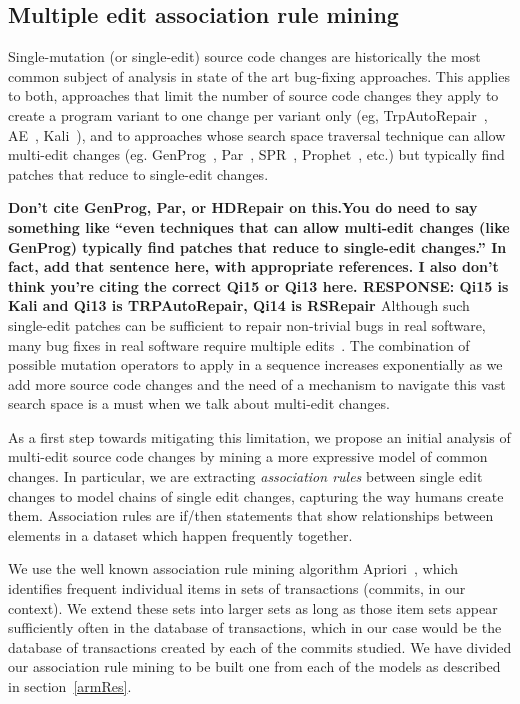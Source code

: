 \documentclass[conference]{IEEEtran}
\newcommand{\todo}[1]
  {{\scriptsize \textbf{\color{red} {#1}}}}
\begin{document}
\subsection{Multiple edit association rule mining} 
\label{multEdit}

Single-mutation (or single-edit) source code changes are historically the most 
common subject of analysis in 
state of the art bug-fixing
approaches. This applies to both, approaches that limit the number of source 
code changes they apply to create a program variant to one change per variant 
only (eg, TrpAutoRepair~\cite{Qi13}, AE~\cite{Weimer13}, Kali~\cite{Qi15}), and 
to approaches whose search space traversal technique can allow multi-edit 
changes (eg. GenProg~\cite{legoues12}, Par~\cite{kim2013}, SPR~\cite{fan15},
Prophet~\cite{Long2016}, etc.) but typically find patches that reduce to single-edit changes.

\todo{Don't cite GenProg, Par, or HDRepair on this.You do need to say something 
like ``even  techniques that can allow multi-edit changes (like GenProg) typically find
  patches that reduce to single-edit changes.''  In fact, add that sentence
  here, with appropriate references.   I also don't think you're
  citing the correct Qi15 or Qi13 here. RESPONSE: Qi15 is Kali and Qi13 is 
TRPAutoRepair, Qi14 is RSRepair }
Although such single-edit patches can be
sufficient to repair non-trivial bugs in real software, many bug fixes in real
software require multiple edits~\cite{Weimer13}. The combination of possible mutation operators to apply in a sequence increases exponentially as we add more source code changes and the need of a mechanism to navigate this vast search space is a must when we talk about multi-edit changes.

As a first step towards mitigating this limitation, we propose 
an initial analysis of multi-edit 
source code changes by mining a more expressive model of common changes. In
particular, we are extracting \emph{association rules} between single edit changes 
to model chains of single edit changes, capturing the way humans create them.
Association rules are if/then statements that show relationships between elements in a dataset which happen frequently together.

We use the 
well known association rule mining algorithm
Apriori~\cite{Agrawal94,Liu98,Zaki2000}, which identifies frequent 
individual items in sets of transactions (commits, in our context).  We extend these sets into 
larger sets as long as those item sets appear sufficiently often in the database 
of transactions, which in our case would be the database of transactions created 
by each of the commits studied. We have divided our association rule mining to
be built one from each of the models as described in section~\ref{armRes}. 
\end{document}
